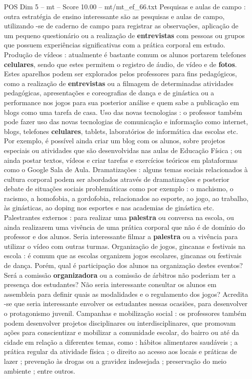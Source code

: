 \begin{textsample}{POS Dim 5 – mt – Score 10.00 – mt/mt\_ef\_66.txt}
Pesquisas e aulas de campo : outra estratégia de ensino interessante são as pesquisas e aulas de campo, utilizando -se de caderno de campo para registrar as observações, aplicação de um pequeno questionário ou a realização de \textbf{entrevistas} com pessoas ou grupos que possuem experiências significativas com a prática corporal em estudo.
Produção de vídeos : atualmente é bastante comum os alunos portarem telefones \textbf{celulares}, sendo que estes permitem o registro de áudio, de vídeo e de \textbf{fotos}.
Estes aparelhos podem ser explorados pelos professores para fins pedagógicos, como a realização de \textbf{entrevistas} ou a filmagem de determinadas atividades pedagógicas, apresentações e coreografias de dança e de ginástica ou a performance nos jogos para sua posterior análise e quem sabe a publicação em blogs como uma tarefa de casa.
Uso das novas tecnologias : o professor também pode fazer uso das novas tecnologias de comunicação e informação como internet, blogs, telefones \textbf{celulares}, tablets, laboratórios de informática das escolas etc.
Por exemplo, é possível ainda criar um blog com os alunos, sobre projetos especiais ou atividades que são desenvolvidas nas aulas de Educação Física ; ou ainda postar textos, vídeos e criar tarefas e exercícios teóricos em plataformas como o Google Sala de Aula.
Dramatizações : alguns temas sociais relacionados à cultura corporal podem ser abordados através de dramatizações e posterior debate de situações sociais problemáticas como por exemplo : o machismo, o racismo, a homofobia, a gordofobia, relacionados ao esporte, ao jogo, ao trabalho, às ginásticas, ao doping nos esportes e nas academias de ginástica etc.
Palestrantes externos : para realizar uma \textbf{palestra} ou conversa na escola, ou ainda realizarem uma vivência de uma prática corporal que não é de domínio do professor e dos alunos.
Seria interessante filmar a \textbf{palestra} ou a vivência para utilizar o vídeo com outras turmas.
Organização de jogos, gincanas e festivais na escola : é comum que as escolas organizem jogos escolares, gincanas ou festivais de dança.
Porém, qual é participação dos alunos na organização destes eventos?
Será a comissão \textbf{organizadora} ou a comissão de árbitros não poderiam ter a presença dos estudantes?
Não seria interessante consultar os alunos em assembleia para definir quais as modalidades e o regulamento dos jogos?
Acredita -se que seria interessante envolver os estudantes nessas ocasiões, para desenvolver o protagonismo juvenil.
Campanhas e mobilização social : os professores também podem desenvolver projetos disciplinares ou interdisciplinares, que promovam ações para conscientizar e mobilizar a comunidade escolar, do bairro ou até da cidade em relação a diferentes temas, como : hábitos alimentares saudáveis ; a prática regular da atividade física ; o direito ao acesso aos locais e práticas de lazer ; prevenção às drogas ou a gravidez indesejada ; preservação do meio ambiente ; entre outros.

\end{textsample}
